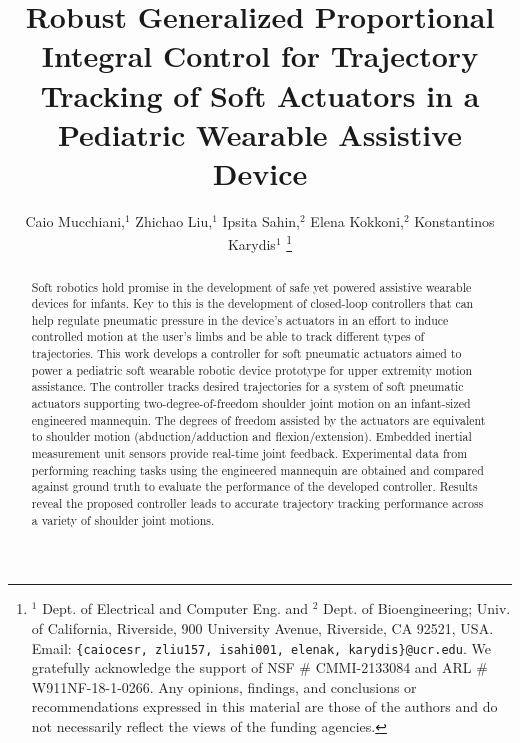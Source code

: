 \documentclass[letterpaper, 10pt, conference]{ieeeconf}      %
\title{\LARGE \bf Robust Generalized Proportional Integral Control for Trajectory Tracking of Soft Actuators in a Pediatric Wearable Assistive Device}
\author{Caio Mucchiani,$^{1}$ Zhichao Liu,$^{1}$ Ipsita Sahin,$^{2}$ Elena Kokkoni,$^{2}$ Konstantinos Karydis$^{1}$%
\thanks{$^{1}$ Dept. of Electrical and Computer Eng. and $^{2}$ Dept. of Bioengineering; Univ. of California, Riverside, 900 University Avenue, Riverside, CA 92521, USA. Email: {\tt\footnotesize\{caiocesr, zliu157, isahi001, elenak, karydis\}@ucr.edu}. 
We gratefully acknowledge the support of NSF \# CMMI-2133084 and ARL \# W911NF-18-1-0266. 
Any opinions, findings, and conclusions or recommendations expressed in this material are those of the authors and do not necessarily reflect the views of the funding agencies.
}}
\begin{document}
\maketitle


\begin{abstract}
Soft robotics hold promise in the development of safe yet powered assistive wearable devices for infants. Key to this is the development of closed-loop controllers that can help regulate pneumatic pressure in the device's actuators in an effort to induce controlled motion at the user's limbs and be able to track different types of trajectories. This work develops a controller for soft pneumatic actuators aimed to power a pediatric soft wearable robotic device prototype for upper extremity motion assistance. The controller tracks desired trajectories for a system of soft pneumatic actuators supporting two-degree-of-freedom shoulder joint motion on an infant-sized engineered mannequin. The degrees of freedom assisted by the actuators are equivalent to shoulder motion (abduction/adduction and flexion/extension). Embedded inertial measurement unit sensors provide real-time joint feedback. Experimental data from performing reaching tasks using the engineered mannequin are obtained and compared against ground truth to evaluate the performance of the developed controller. Results reveal the proposed controller leads to accurate trajectory tracking performance across a variety of shoulder joint motions. 
\end{abstract}



%
\end{document}

